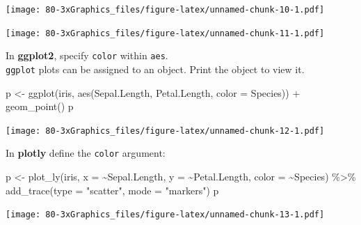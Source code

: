 \documentclass[
]{book}
\newenvironment{Shaded}{\begin{snugshade}}{\end{snugshade}}
\newcommand{\AttributeTok}[1]{\textcolor[rgb]{0.77,0.63,0.00}{#1}}
\newcommand{\FunctionTok}[1]{\textcolor[rgb]{0.00,0.00,0.00}{#1}}
\newcommand{\NormalTok}[1]{#1}
\newcommand{\OtherTok}[1]{\textcolor[rgb]{0.56,0.35,0.01}{#1}}
\newcommand{\SpecialCharTok}[1]{\textcolor[rgb]{0.00,0.00,0.00}{#1}}
\newcommand{\StringTok}[1]{\textcolor[rgb]{0.31,0.60,0.02}{#1}}
\begin{document}
\texttt{[image: 80-3xGraphics\_files/figure-latex/unnamed-chunk-10-1.pdf]}

\begin{Shaded}
\end{Shaded}

\texttt{[image: 80-3xGraphics\_files/figure-latex/unnamed-chunk-11-1.pdf]}

In \textbf{ggplot2}, specify \texttt{color} within \texttt{aes}.\\
\texttt{ggplot} plots can be assigned to an object. Print the object to view it.

\begin{Shaded}
\begin{Highlighting}[]
\NormalTok{p }\OtherTok{\textless{}{-}} \FunctionTok{ggplot}\NormalTok{(iris, }\FunctionTok{aes}\NormalTok{(Sepal.Length, Petal.Length, }\AttributeTok{color =}\NormalTok{ Species)) }\SpecialCharTok{+}
  \FunctionTok{geom\_point}\NormalTok{()}
\NormalTok{p}
\end{Highlighting}
\end{Shaded}

\texttt{[image: 80-3xGraphics\_files/figure-latex/unnamed-chunk-12-1.pdf]}

In \textbf{plotly} define the \texttt{color} argument:

\begin{Shaded}
\begin{Highlighting}[]
\NormalTok{p }\OtherTok{\textless{}{-}} \FunctionTok{plot\_ly}\NormalTok{(iris, }\AttributeTok{x =} \SpecialCharTok{\textasciitilde{}}\NormalTok{Sepal.Length, }\AttributeTok{y =} \SpecialCharTok{\textasciitilde{}}\NormalTok{Petal.Length, }\AttributeTok{color =} \SpecialCharTok{\textasciitilde{}}\NormalTok{Species) }\SpecialCharTok{\%\textgreater{}\%} 
  \FunctionTok{add\_trace}\NormalTok{(}\AttributeTok{type =} \StringTok{"scatter"}\NormalTok{, }\AttributeTok{mode =} \StringTok{"markers"}\NormalTok{)}
\NormalTok{p}
\end{Highlighting}
\end{Shaded}

\texttt{[image: 80-3xGraphics\_files/figure-latex/unnamed-chunk-13-1.pdf]}
\end{document}
